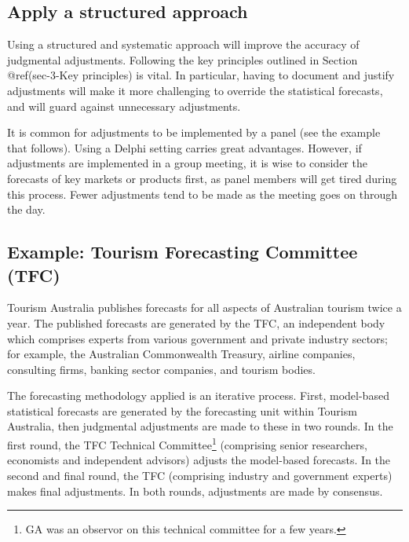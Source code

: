 \documentclass[]{book}
\let\rmarkdownfootnote\footnote%
\def\footnote{\protect\rmarkdownfootnote}
\begin{document}
\hypertarget{apply-a-structured-approach}{%
\subsection*{Apply a structured approach}\label{apply-a-structured-approach}}

Using a structured and systematic approach will improve the accuracy of judgmental adjustments. Following the key principles outlined in Section @ref(sec-3-Key principles) is vital. In particular, having to document and justify adjustments will make it more challenging to override the statistical forecasts, and will guard against unnecessary adjustments.

It is common for adjustments to be implemented by a panel (see the example that follows). Using a Delphi setting carries great advantages. However, if adjustments are implemented in a group meeting, it is wise to consider the forecasts of key markets or products first, as panel members will get tired during this process. Fewer adjustments tend to be made as the meeting goes on through the day.

\hypertarget{example-tourism-forecasting-committee-tfc}{%
\subsection*{Example: Tourism Forecasting Committee (TFC)}\label{example-tourism-forecasting-committee-tfc}}

Tourism Australia publishes forecasts for all aspects of Australian tourism twice a year. The published forecasts are generated by the TFC, an independent body which comprises experts from various government and private industry sectors; for example, the Australian Commonwealth Treasury, airline companies, consulting firms, banking sector companies, and tourism bodies.

The forecasting methodology applied is an iterative process. First, model-based statistical forecasts are generated by the forecasting unit within Tourism Australia, then judgmental adjustments are made to these in two rounds. In the first round, the TFC Technical Committee\footnote{GA was an observor on this technical committee for a few years.} (comprising senior researchers, economists and independent advisors) adjusts the model-based forecasts. In the second and final round, the TFC (comprising industry and government experts) makes final adjustments. In both rounds, adjustments are made by consensus.
\end{document}

